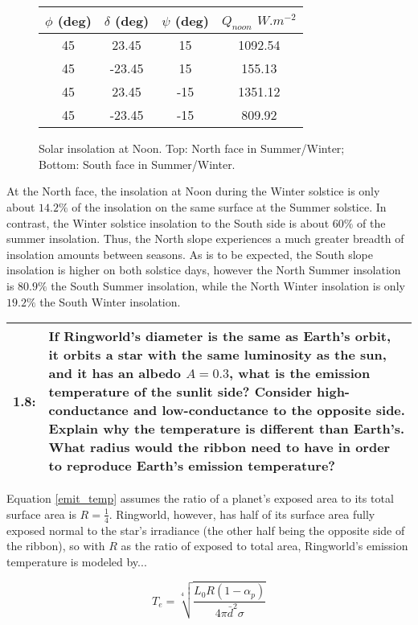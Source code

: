 \documentclass[12pt]{article}
\newcommand*{\problem}[2]{
    \begin{table}[ht]
    \centering
        \begin{tabular}{ | p{.1\linewidth} p{.9\linewidth} | }
            \hline
            \vspace{.3em}\textbf{\large#1:} & \vspace{.3em}\small{#2}\hspace{.2em}\vspace{.5em} \\ \hline
        \end{tabular}
    \end{table}
}
\begin{document}
\begin{figure}[h!]
    \centering
    \begin{tabular}{c c c c}
        $\phi$ (deg) & $\delta$ (deg) & $\psi$ (deg) & $Q_{noon}$ $\si{W.m^{-2}}$ \\
        \hline
        \hline
        45 & 23.45 & 15 & 1092.54 \\ %
        45 & -23.45 & 15 & 155.13 \\ %
        \hline
        45 & 23.45 & -15 & 1351.12 \\ %
        45 & -23.45& -15 & 809.92 \\ %
    \end{tabular}
    \caption{Solar insolation at Noon. Top: North face in Summer/Winter; Bottom: South face in Summer/Winter.}
\end{figure}

At the North face, the insolation at Noon during the Winter solstice is only about $14.2\%$ of the insolation on the same surface at the Summer solstice. In contrast, the Winter solstice insolation to the South side is about $60\%$ of the summer insolation. Thus, the North slope experiences a much greater breadth of insolation amounts between seasons. As is to be expected, the South slope insolation is higher on both solstice days, however the North Summer insolation is $80.9\%$ the South Summer insolation, while the North Winter insolation is only $19.2\%$ the South Winter insolation.

\problem{1.8}{If Ringworld's diameter is the same as Earth's orbit, it orbits a star with the same luminosity as the sun, and it has an albedo $A=0.3$, what is the emission temperature of the sunlit side? Consider high-conductance and low-conductance to the opposite side. Explain why the temperature is different than Earth's. What radius would the ribbon need to have in order to reproduce Earth's emission temperature?}

Equation \ref{emit_temp} assumes the ratio of a planet's exposed area to its total surface area is $R = \frac{1}{4}$. Ringworld, however, has half of its surface area fully exposed normal to the star's irradiance (the other half being the opposite side of the ribbon), so with $R$ as the ratio of exposed to total area, Ringworld's emission temperature is modeled by...

\begin{figure}[h!]
    \begin{equation}\label{emit_temp_rw}
        T_e = \sqrt[4]{\frac{L_0 R (1-\alpha_p)}{4\pi \bar{d}^2 \sigma}}
    \end{equation}
\end{figure}
\end{document}
